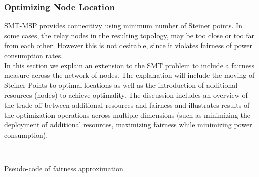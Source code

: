 \subsubsection{Optimizing Node Location}
SMT-MSP provides connecitivy using minimum number of Steiner points. In some cases, the relay nodes in the resulting topology, may be too close or too far from each other. However this is not desirable, since it violates fairness of power consumption rates.  \\

In this section we explain an extension to the SMT problem to include a fairness measure across the network of nodes.
The explanation will include the moving of Steiner Points to optimal locations as well as the introduction of additional resources (nodes) to achieve optimality. The discussion includes an overview of the trade-off between additional resources and  fairness and illustrates results of the optimization operations across multiple dimensions (such as minimizing the deployment of additional resources, maximizing fairness while minimizing power consumption).\\ 


\begin{algorithm}[t]

\dontprintsemicolon
{}
\\
\caption{Pseudo-code of fairness approximation\label{IR}}
\end{algorithm}


